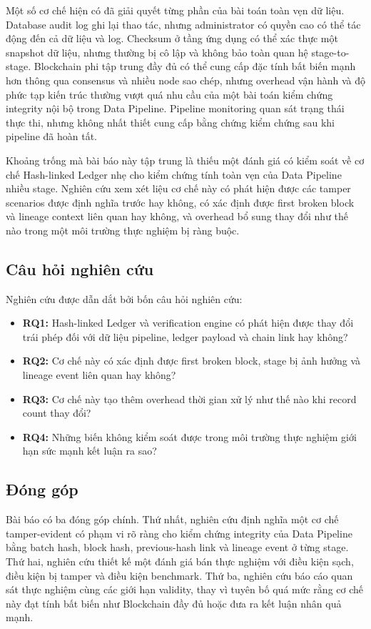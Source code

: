 Một số cơ chế hiện có đã giải quyết từng phần của bài toán toàn vẹn dữ liệu. Database audit log ghi lại thao tác, nhưng administrator có quyền cao có thể tác động đến cả dữ liệu và log. Checksum ở tầng ứng dụng có thể xác thực một snapshot dữ liệu, nhưng thường bị cô lập và không bảo toàn quan hệ stage-to-stage. Blockchain phi tập trung đầy đủ có thể cung cấp đặc tính bất biến mạnh hơn thông qua consensus và nhiều node sao chép, nhưng overhead vận hành và độ phức tạp kiến trúc thường vượt quá nhu cầu của một bài toán kiểm chứng integrity nội bộ trong Data Pipeline. Pipeline monitoring quan sát trạng thái thực thi, nhưng không nhất thiết cung cấp bằng chứng kiểm chứng sau khi pipeline đã hoàn tất.

Khoảng trống mà bài báo này tập trung là thiếu một đánh giá có kiểm soát về cơ chế Hash-linked Ledger nhẹ cho kiểm chứng tính toàn vẹn của Data Pipeline nhiều stage. Nghiên cứu xem xét liệu cơ chế này có phát hiện được các tamper scenarios được định nghĩa trước hay không, có xác định được first broken block và lineage context liên quan hay không, và overhead bổ sung thay đổi như thế nào trong một môi trường thực nghiệm bị ràng buộc.

\subsection{Câu hỏi nghiên cứu}

Nghiên cứu được dẫn dắt bởi bốn câu hỏi nghiên cứu:

\begin{itemize}
    \item \textbf{RQ1:} Hash-linked Ledger và verification engine có phát hiện được thay đổi trái phép đối với dữ liệu pipeline, ledger payload và chain link hay không?
    \item \textbf{RQ2:} Cơ chế này có xác định được first broken block, stage bị ảnh hưởng và lineage event liên quan hay không?
    \item \textbf{RQ3:} Cơ chế này tạo thêm overhead thời gian xử lý như thế nào khi record count thay đổi?
    \item \textbf{RQ4:} Những biến không kiểm soát được trong môi trường thực nghiệm giới hạn sức mạnh kết luận ra sao?
\end{itemize}

\subsection{Đóng góp}

Bài báo có ba đóng góp chính. Thứ nhất, nghiên cứu định nghĩa một cơ chế tamper-evident có phạm vi rõ ràng cho kiểm chứng integrity của Data Pipeline bằng batch hash, block hash, previous-hash link và lineage event ở từng stage. Thứ hai, nghiên cứu thiết kế một đánh giá bán thực nghiệm với điều kiện sạch, điều kiện bị tamper và điều kiện benchmark. Thứ ba, nghiên cứu báo cáo quan sát thực nghiệm cùng các giới hạn validity, thay vì tuyên bố quá mức rằng cơ chế này đạt tính bất biến như Blockchain đầy đủ hoặc đưa ra kết luận nhân quả mạnh.
